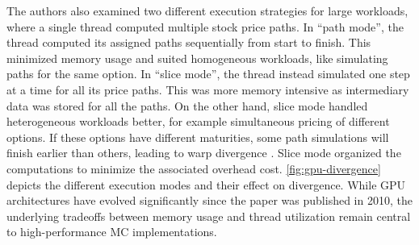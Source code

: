 \documentclass[english,12pt,a4paper,pdftex,sci,utf8]{aaltothesis}
\begin{document}
The authors also examined two different execution strategies for large workloads, where a single thread computed multiple stock price paths. In ``path mode'', the thread computed its assigned paths sequentially from start to finish. This minimized memory usage and suited homogeneous workloads, like simulating paths for the same option. In ``slice mode'', the thread instead simulated one step at a time for all its price paths. This was more memory intensive as intermediary data was stored for all the paths. On the other hand, slice mode handled heterogeneous workloads better, for example simultaneous pricing of different options. If these options have different maturities, some path simulations will finish earlier than others, leading to warp divergence \cite{liu2010efficient}. Slice mode organized the computations to minimize the associated overhead cost. \cref{fig:gpu-divergence} depicts the different execution modes and their effect on divergence. While GPU architectures have evolved significantly since the paper was published in 2010, the underlying tradeoffs between memory usage and thread utilization remain central to high-performance MC implementations.
\end{document}
